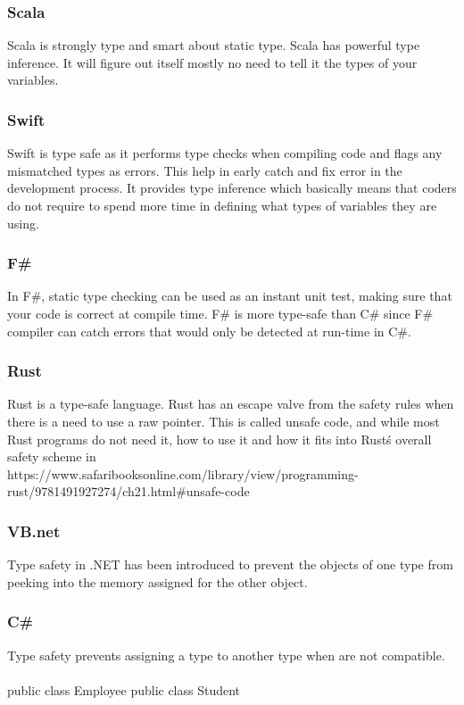 \documentclass{sig-alternate}
\begin{document}
	\subsubsection{Scala}
	Scala is strongly type and smart about static type. Scala has powerful type inference. It will figure out itself mostly no need to tell it the types of your variables. 
	\subsubsection{Swift}
	Swift is type safe as it performs type checks when compiling code and flags any mismatched types as errors. This help in early catch and fix error in the development process. It provides type inference which basically means that coders do not require to spend more time in defining what types of variables they are using.
	\subsubsection{F\#}
	In F\#, static type checking can be used as an instant unit test, making sure that your code is correct at compile time. F\# is more type-safe than C\# since F\# compiler can catch errors that would only be detected at run-time in C\#.
	\subsubsection{Rust }
	Rust is a type-safe language. Rust has an escape valve from the safety rules when there is a need to use a raw pointer. This is called unsafe code, and while most Rust programs do not need it, how to use it and how it fits into Rust\'s overall safety scheme in \cite{WinNT}
	\\ https://www.safaribooksonline.com/library/view/programming-rust/9781491927274/ch21.html\#unsafe-code
	
	\subsubsection{VB.net}
	Type safety in .NET has been introduced to prevent the objects of one type from peeking into the memory assigned for the other object.
	\subsubsection{C\#}
	Type safety prevents assigning a type to another type when are not compatible.\\ \\
	public class Employee{}
	public class Student{}\\
	
\end{document}
